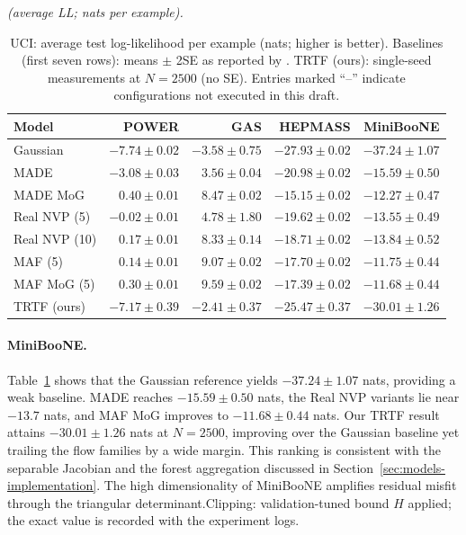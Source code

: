 \documentclass[11pt,a4paper,twoside]{book}\usepackage[]{graphicx}\usepackage[]{xcolor}
\begin{document}
\begin{table}[htbp]
  \centering
  \textit{(average LL; nats per example).}
  \caption{UCI: average test log-likelihood per example (nats; higher is better). Baselines (first seven rows): means $\pm$ 2SE as reported by \citet{papamakarios2017masked}. TRTF (ours): single-seed measurements at $N=2500$ (no SE). Entries marked ``--'' indicate configurations not executed in this draft.}
  \label{tab:uci-loglik}
  \begin{tabular}{lrrrr}
    \hline
    Model & POWER & GAS & HEPMASS & MiniBooNE \\
    \hline
    Gaussian          & $-7.74 \pm 0.02$ & $-3.58 \pm 0.75$ & $-27.93 \pm 0.02$ & $-37.24 \pm 1.07$ \\
    MADE              & $-3.08 \pm 0.03$ & $ 3.56 \pm 0.04$ & $-20.98 \pm 0.02$ & $-15.59 \pm 0.50$ \\
    MADE MoG          & $ 0.40 \pm 0.01$ & $ 8.47 \pm 0.02$ & $-15.15 \pm 0.02$ & $-12.27 \pm 0.47$ \\
    Real NVP (5)      & $-0.02 \pm 0.01$ & $ 4.78 \pm 1.80$ & $-19.62 \pm 0.02$ & $-13.55 \pm 0.49$ \\
    Real NVP (10)     & $ 0.17 \pm 0.01$ & $ 8.33 \pm 0.14$ & $-18.71 \pm 0.02$ & $-13.84 \pm 0.52$ \\
    MAF (5)           & $ 0.14 \pm 0.01$ & $ 9.07 \pm 0.02$ & $-17.70 \pm 0.02$ & $-11.75 \pm 0.44$ \\
    MAF MoG (5)       & $ 0.30 \pm 0.01$ & $ 9.59 \pm 0.02$ & $-17.39 \pm 0.02$ & $-11.68 \pm 0.44$ \\
    TRTF (ours)    & $-7.17 \pm 0.39$ & $-2.41 \pm 0.37$ & $-25.47 \pm 0.37$ & $-30.01 \pm 1.26$ \\
    \hline
  \end{tabular}
\end{table}

\paragraph{MiniBooNE.} Table~\ref{tab:uci-loglik} shows that the Gaussian reference yields $-37.24 \pm 1.07$ nats, providing a weak baseline. MADE reaches $-15.59 \pm 0.50$ nats, the Real NVP variants lie near $-13.7$ nats, and MAF MoG improves to $-11.68 \pm 0.44$ nats. Our TRTF result attains $-30.01 \pm 1.26$ nats at $N=2500$, improving over the Gaussian baseline yet trailing the flow families by a wide margin. This ranking is consistent with the separable Jacobian and the forest aggregation discussed in Section~\ref{sec:models-implementation}. The high dimensionality of MiniBooNE amplifies residual misfit through the triangular determinant.\;Clipping: validation-tuned bound $H$ applied; the exact value is recorded with the experiment logs.
\end{document}
